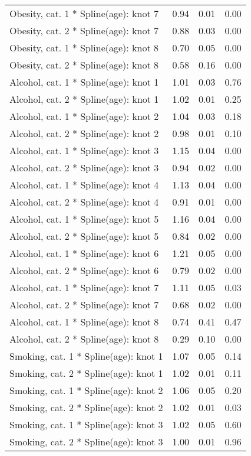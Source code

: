 \documentclass[risks,article,submit,moreauthors,pdftex]{Definitions/mdpi}
\begin{document}
\begin{longtable}{lrrr}
Obesity, cat. 1 * Spline(age): knot 7 & 0.94 & 0.01 & 0.00 \\ 
Obesity, cat. 2 * Spline(age): knot 7 & 0.88 & 0.03 & 0.00 \\ 
Obesity, cat. 1 * Spline(age): knot 8 & 0.70 & 0.05 & 0.00 \\ 
Obesity, cat. 2 * Spline(age): knot 8 & 0.58 & 0.16 & 0.00 \\ 
Alcohol, cat. 1 * Spline(age): knot 1 & 1.01 & 0.03 & 0.76 \\ 
Alcohol, cat. 2 * Spline(age): knot 1 & 1.02 & 0.01 & 0.25 \\ 
Alcohol, cat. 1 * Spline(age): knot 2 & 1.04 & 0.03 & 0.18 \\ 
Alcohol, cat. 2 * Spline(age): knot 2 & 0.98 & 0.01 & 0.10 \\ 
Alcohol, cat. 1 * Spline(age): knot 3 & 1.15 & 0.04 & 0.00 \\ 
Alcohol, cat. 2 * Spline(age): knot 3 & 0.94 & 0.02 & 0.00 \\ 
Alcohol, cat. 1 * Spline(age): knot 4 & 1.13 & 0.04 & 0.00 \\ 
Alcohol, cat. 2 * Spline(age): knot 4 & 0.91 & 0.01 & 0.00 \\ 
Alcohol, cat. 1 * Spline(age): knot 5 & 1.16 & 0.04 & 0.00 \\ 
Alcohol, cat. 2 * Spline(age): knot 5 & 0.84 & 0.02 & 0.00 \\ 
Alcohol, cat. 1 * Spline(age): knot 6 & 1.21 & 0.05 & 0.00 \\ 
Alcohol, cat. 2 * Spline(age): knot 6 & 0.79 & 0.02 & 0.00 \\ 
Alcohol, cat. 1 * Spline(age): knot 7 & 1.11 & 0.05 & 0.03 \\ 
Alcohol, cat. 2 * Spline(age): knot 7 & 0.68 & 0.02 & 0.00 \\ 
Alcohol, cat. 1 * Spline(age): knot 8 & 0.74 & 0.41 & 0.47 \\ 
Alcohol, cat. 2 * Spline(age): knot 8 & 0.29 & 0.10 & 0.00 \\ 
Smoking, cat. 1 * Spline(age): knot 1 & 1.07 & 0.05 & 0.14 \\ 
Smoking, cat. 2 * Spline(age): knot 1 & 1.02 & 0.01 & 0.11 \\ 
Smoking, cat. 1 * Spline(age): knot 2 & 1.06 & 0.05 & 0.20 \\ 
Smoking, cat. 2 * Spline(age): knot 2 & 1.02 & 0.01 & 0.03 \\ 
Smoking, cat. 1 * Spline(age): knot 3 & 1.02 & 0.05 & 0.60 \\ 
Smoking, cat. 2 * Spline(age): knot 3 & 1.00 & 0.01 & 0.96 \\ 

\end{longtable}
\end{document}
